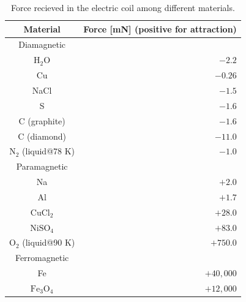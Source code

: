 \begin{table}[H]
  \centering
  \caption{Force recieved in the electric coil among different materials.\cite{2_13}}
  \label{tab:2_coilResult}
  \begin{tabular}{cr}\hline\hline
    Material & Force [mN] (positive for attraction) \\\hline
    Diamagnetic & \\
    $\mathrm{H_2O}$ & $-2.2$\\
    Cu & $-0.26$\\
    NaCl & $-1.5$\\
    S & $-1.6$\\
    C (graphite) & $-1.6$\\
    C (diamond) & $-11.0$\\
    $\mathrm{N_2}$ (liquid@78 K) & $-1.0$\\\hline
    Paramagnetic & \\
    Na & $+2.0$\\
    Al & $+1.7$\\
    $\mathrm{CuCl_2}$ & $+28.0$\\
    $\mathrm{NiSO_4}$ & $+83.0$\\
    $\mathrm{O_2}$ (liquid@90 K) & $+750.0$\\\hline
    Ferromagnetic & \\
    Fe & $+40,000$\\
    $\mathrm{Fe_3O_4}$ & $+12,000$\\\hline
  \end{tabular}
\end{table}
